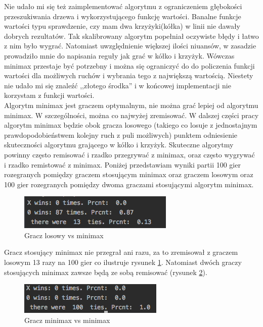 \documentclass[licencjacka]{pracamgr}
\begin{document}
Nie udało mi się też zaimplementować algorytmu z ograniczeniem głębokości przeszukiwania drzewa i wykorzystującego funkcję wartości. Banalne funkcje wartości typu sprawdzenie,  czy mam dwa krzyżyki(kółka) w linii nie dawały dobrych rezultatów. Tak skalibrowany algorytm popełniał oczywiste błędy i łatwo z nim było wygrać.  Natomiast uwzględnienie większej ilości niuansów, w zasadzie prowadziło mnie  do napisania reguły jak grać w kółko i krzyżyk. Wówczas minimax przestaje być potrzebny i można się ograniczyć do do policzenia funkcji wartości dla możliwych ruchów i wybrania tego z największą wartością. Niestety nie udało mi się znaleźć ,,złotego środka'' i w końcowej implementacji nie korzystam z funkcji wartości. \\

Algorytm minimax jest graczem optymalnym, nie można grać lepiej od algorytmu minimax. W szczególności, można co najwyżej zremisować. W dalszej części pracy algorytm minimax będzie obok gracza losowego (takiego co losuje z jednostajnym prawdopodobieństwem kolejny ruch z puli możliwych) punktem odniesienie skuteczności algorytmu grającego w kółko i krzyżyk. Skuteczne algorytmy powinny często remisować i rzadko przegrywać z minimax, oraz często wygrywać i rzadko remistować z minimax. Poniżej przedstawiam wyniki partii 100 gier rozegranych pomiędzy graczem stosującym minimax oraz graczem losowym  oraz 100 gier rozegranych pomiędzy dwoma graczami stosującymi algorytm minimax.\\ 

\begin{figure}[h!]
	\includegraphics [scale=0.6] {random_minimax.png}
	\caption{Gracz losowy vs minimax}
	\label{Rys5}
\end{figure}

Gracz stosujący minimax nie przegrał ani razu, za to zremisował z graczem losowym 13 razy na 100 gier co ilustruje rysunek \ref{Rys5}. 
Natomiast dwóch graczy stosujących minimax zawsze będą ze sobą remisować (rysunek \ref{Rys6}). 

\begin{figure}[h!]
	\includegraphics [scale=0.6] {minimax_minimax.png}
	\caption{Gracz minimax vs minimax}
	\label{Rys6}
\end{figure}
\end{document}
